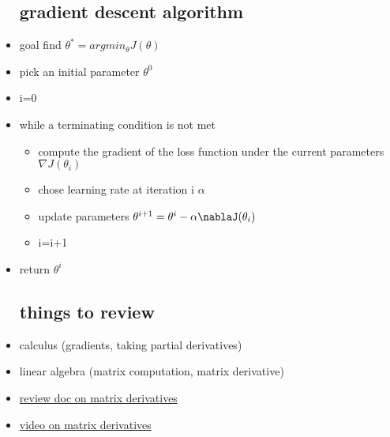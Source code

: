 \documentclass{article}
\begin{document}
\begin{itemize}
\subsection{gradient descent algorithm }
\item goal find $\theta^{*}=argmin_{\theta}J(\theta)$
\item pick an initial parameter $\theta^{0}$
\item i=0
\item while a terminating condition is not met 
\begin{itemize}
    \item compute the gradient of the loss function under the current parameters $\nabla J(\theta_{i})$
    \item chose learning rate at iteration i $\alpha$
    \item update parameters $\theta^{i+1}=\theta^{i}-\alpha\nablaJ(\theta_{i})$
    \item i=i+1
\end{itemize}
\item return $\theta^{i}$
\subsection{things to review}
\item calculus (gradients, taking partial derivatives)
\item linear algebra (matrix computation, matrix derivative) 
\item \href{https://atmos.uw.edu/~dennis/MatrixCalculus.pdf}{review doc on matrix derivatives}
\item \href{https://www.google.com/search?q=matrix+derivatives&client=firefox-b-1-d&sxsrf=AJOqlzWzsO3VhsZOCN54m6cyXxfVv8oBDw:1674778593507&source=lnms&tbm=vid&sa=X&ved=2ahUKEwiJupK5vOb8AhUxD1kFHa6WBmoQ_AUoAnoECAEQBA&biw=622&bih=560&dpr=1.62#fpstate=ive&vld=cid:691f0298,vid:FCWrduAxf-Q}{video on matrix derivatives}
\end{itemize}
\end{document}
